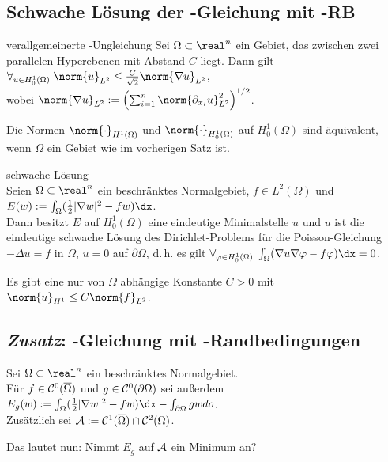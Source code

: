 \subsection{%
    Schwache Lösung der -Gleichung mit -RB%
}

\begin{Satz}{verallgemeinerte -Ungleichung}
    Sei $\Omega \subset \real^n$ ein Gebiet, das zwischen zwei parallelen Hyperebenen
    mit Abstand $C$ liegt.
    Dann gilt $\forall_{u \in H^1_0(\Omega)}\;
    \norm{u}_{L^2} \le \frac{C}{\sqrt{2}} \norm{\nabla u}_{L^2}$,\\
    wobei $\norm{\nabla u}_{L^2} :=
    \left(\sum_{i=1}^n \norm{\partial_{x_i} u}_{L^2}^2\right)^{1/2}$.
\end{Satz}

\begin{Kor}
    Die Normen $\norm{\cdot}_{H^1(\Omega)}$ und $\norm{\cdot}_{H_0^1(\Omega)}$ auf $H_0^1(\Omega)$
    sind äquivalent, wenn $\Omega$ ein Gebiet wie im vorherigen Satz ist.
\end{Kor}

\linie

\begin{Satz}{schwache Lösung}\\
    Seien $\Omega \subset \real^n$ ein beschränktes Normalgebiet, $f \in L^2(\Omega)$ und
    $E(w) := \int_\Omega (\frac{1}{2} |\nabla w|^2 - fw)\dx$.\\
    Dann besitzt $E$ auf $H_0^1(\Omega)$ eine eindeutige Minimalstelle $u$ und $u$ ist die
    eindeutige schwache Lösung des Dirichlet-Problems für die Poisson-Gleichung
    $-\Delta u = f$ in $\Omega$, $u = 0$ auf $\partial\Omega$, d.\,h. es gilt
    $\forall_{\varphi \in H_0^1(\Omega)}\; \int_\Omega (\nabla u \nabla \varphi - f\varphi)\dx = 0$.
\end{Satz}

\begin{Bem}
    Es gibt eine nur von $\Omega$ abhängige Konstante $C > 0$ mit
    $\norm{u}_{H^1} \le C \norm{f}_{L^2}$.
\end{Bem}

\pagebreak

\subsection{%
    \emph{Zusatz}: -Gleichung mit -Randbedingungen%
}

\begin{Bem}
    Sei $\Omega \subset \real^n$ ein beschränktes Normalgebiet.\\
    Für $f \in \mathcal{C}^0(\overline{\Omega})$ und $g \in \mathcal{C}^0(\partial\Omega)$ sei außerdem
    $E_g(w) := \int_\Omega (\frac{1}{2} |\nabla w|^2 - fw) \dx - \int_{\partial\Omega} gw do$.\\
    Zusätzlich sei $\mathcal{A} := \mathcal{C}^1(\overline{\Omega}) \cap \mathcal{C}^2(\Omega)$.
    
    Das  lautet nun:
    Nimmt $E_g$ auf $\mathcal{A}$ ein Minimum an?
\end{Bem}

